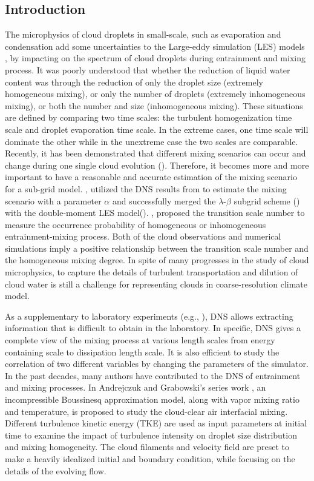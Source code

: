 \documentclass[draft,jgrga]{AGUTeX}
\begin{document}
\begin{article}

\section{Introduction}
The microphysics of cloud droplets in small-scale, such as evaporation and condensation add some uncertainties to the Large-eddy simulation (LES) models \cite{Jarecka13}, by impacting on the spectrum of cloud droplets during entrainment and mixing process. It was poorly understood that whether the reduction of liquid water content was through the reduction of only the droplet size (extremely homogeneous mixing), or only the number of droplets (extremely inhomogeneous mixing), or both the number and size (inhomogeneous mixing). These situations are defined by comparing two time scales: the turbulent homogenization time scale and droplet evaporation time scale. In the extreme cases, one time scale will dominate the other while in the unextreme case the two scales are comparable. Recently, it has been demonstrated that different mixing scenarios can occur and change during one single cloud evolution (\cite{And09,Burnet07,Lehmann09}). Therefore, it becomes more and more important to have a reasonable and accurate estimation of the mixing scenario for a sub-grid model. \cite{Jarecka2013}, utilized the DNS results from \cite{And04,And06,And09}  to estimate the mixing scenario with a parameter $\alpha$ and successfully merged the $\lambda$-$\beta$ subgrid scheme (\cite{Jarecka2009}) with the double-moment LES model(\cite{Morrison2008}). \cite{Lu2013}, proposed the transition scale number to measure the occurrence probability of homogeneous or inhomogeneous entrainment-mixing process. Both of the cloud observations and numerical simulations imply a positive relationship between the transition scale number and the homogeneous mixing degree. In spite of many progresses in the study of cloud microphysics, to capture the details of turbulent transportation and dilution of cloud water is still a challenge for representing clouds in coarse-resolution climate model.
   
As a supplementary to laboratory experiments (e.g., \cite{Malinowski1998}), DNS allows extracting information that is difficult to obtain in the laboratory. In specific, DNS gives a complete view of the mixing process at various length scales from energy containing scale to dissipation length scale.
It is also efficient to study the correlation of two different variables by changing the parameters of the simulator. In the past decades, many authors have contributed to the DNS
of entrainment and mixing processes. In Andrejczuk and Grabowski's series work \cite{And04,And06,And09}, an incompressible Boussinesq approximation model, along with vapor mixing ratio and temperature, is proposed to study the cloud-clear air interfacial mixing. Different turbulence kinetic energy (TKE) are used as input parameters at initial time to examine the impact of turbulence intensity on droplet size distribution and mixing homogeneity. The cloud filaments and velocity field are preset to make a heavily idealized initial and boundary condition, while focusing on the details of the evolving flow. 


\end{article}
\end{document}

